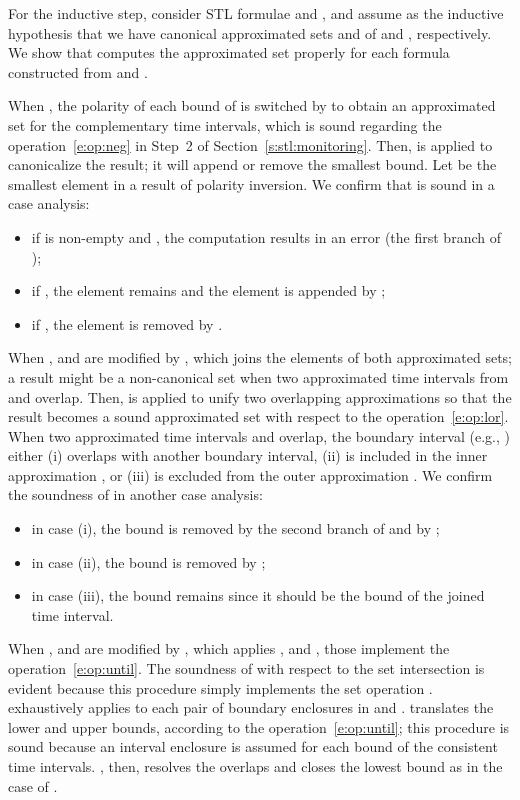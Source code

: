\documentclass[paper]{ieice}
\newcommand{\Todo}[1]{}
\begin{document}
For the inductive step, consider STL formulae  and , and assume as the inductive hypothesis that we have canonical approximated sets  and  of  and , respectively.
We show that  computes the approximated set properly for each formula constructed from  and .

When , the polarity of each bound of  is switched by  to obtain an approximated set for the complementary time intervals, which is sound regarding the operation~\eqref{e:op:neg} in Step~2 of Section~\ref{s:stl:monitoring}.
Then,  is applied to canonicalize the result;
it will append or remove the smallest bound.
Let  be the smallest element in a result of polarity inversion.
We confirm that  is sound in a case analysis:
\begin{itemize}
\item if  is non-empty and , the computation results in an error (the first branch of );
\item if , the element remains and the element  is appended by ;
\item if , the element is removed by .
\end{itemize}


When ,  and  are modified by , which joins the elements of both approximated sets; a result might be a non-canonical set when two approximated time intervals from  and  overlap.
Then,  is applied to unify two overlapping approximations so that the result becomes a sound approximated set with respect to the operation~\eqref{e:op:lor}.
When two approximated time intervals  and  overlap, the boundary interval (e.g., ) either (i) overlaps with another boundary interval, (ii) is included in the inner approximation , or (iii) is excluded from the outer approximation . \Todo{Need a figure?}
We confirm the soundness of  in another case analysis:
\begin{itemize}
\item in case (i), the bound is removed by the second branch of  and by ;
\item in case (ii), the bound is removed by ; 
\item in case (iii), the bound remains since it should be the bound of the joined time interval.
\end{itemize}

When ,  and  are modified by , which applies ,  and , those implement the operation~\eqref{e:op:until}.
The soundness of  with respect to the set intersection is evident because this procedure simply implements the set operation .
 exhaustively applies  to each pair of boundary enclosures in  and .
 translates the lower and upper bounds, according to the operation~\eqref{e:op:until}; this procedure is sound because an interval enclosure is assumed for each bound of the consistent time intervals.
, then, resolves the overlaps and closes the lowest bound as in the case of .
\Qed
\end{document}
